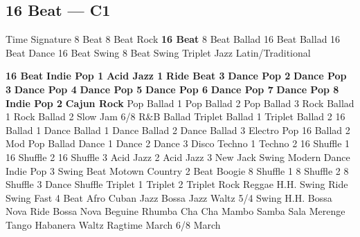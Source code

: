 \subsection{16 Beat --- \UiKey{\II}\UiKey{\MET}C1}
Time Signature
8 Beat
8 Beat Rock
\textbf{16 Beat}
8 Beat Ballad
16 Beat Ballad
16 Beat Dance
16 Beat Swing
8 Beat Swing
Triplet
Jazz
Latin/Traditional





























\textbf{16 Beat}
\textbf{Indie Pop 1}
\textbf{Acid Jazz 1}
\textbf{Ride Beat 3}
\textbf{Dance Pop 2}
\textbf{Dance Pop 3}
\textbf{Dance Pop 4}
\textbf{Dance Pop 5}
\textbf{Dance Pop 6}
\textbf{Dance Pop 7}
\textbf{Dance Pop 8}
\textbf{Indie Pop 2}
\textbf{Cajun Rock}
Pop Ballad 1
Pop Ballad 2
Pop Ballad 3
Rock Ballad 1
Rock Ballad 2
Slow Jam
6/8 R\&B Ballad
Triplet Ballad 1
Triplet Ballad 2
16 Ballad 1
Dance Ballad 1
Dance Ballad 2
Dance Ballad 3
Electro Pop
16 Ballad 2
Mod Pop Ballad
Dance 1
Dance 2
Dance 3
Disco
Techno 1
Techno 2
16 Shuffle 1
16 Shuffle 2
16 Shuffle 3
Acid Jazz 2
Acid Jazz 3
New Jack Swing
Modern Dance
Indie Pop 3
Swing Beat
Motown
Country 2 Beat
Boogie
8 Shuffle 1
8 Shuffle 2
8 Shuffle 3
Dance Shuffle
Triplet 1
Triplet 2
Triplet Rock
Reggae
H.H. Swing
Ride Swing
Fast 4 Beat
Afro Cuban
Jazz Bossa
Jazz Waltz
5/4 Swing
H.H. Bossa Nova
Ride Bossa Nova
Beguine
Rhumba
Cha Cha
Mambo
Samba
Sala
Merenge
Tango
Habanera
Waltz
Ragtime
March
6/8 March
